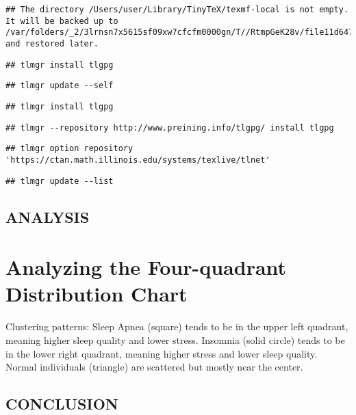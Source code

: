 \documentclass[
]{article}
\begin{document}
\begin{verbatim}
## The directory /Users/user/Library/TinyTeX/texmf-local is not empty. It will be backed up to /var/folders/_2/3lrnsn7x5615sf09xw7cfcfm0000gn/T//RtmpGeK28v/file11d647e927820 and restored later.
\end{verbatim}

\begin{verbatim}
## tlmgr install tlgpg
\end{verbatim}

\begin{verbatim}
## tlmgr update --self
\end{verbatim}

\begin{verbatim}
## tlmgr install tlgpg
\end{verbatim}

\begin{verbatim}
## tlmgr --repository http://www.preining.info/tlgpg/ install tlgpg
\end{verbatim}

\begin{verbatim}
## tlmgr option repository 'https://ctan.math.illinois.edu/systems/texlive/tlnet'
\end{verbatim}

\begin{verbatim}
## tlmgr update --list
\end{verbatim}

\subsection{ANALYSIS}\label{analysis}

\section{Analyzing the Four-quadrant Distribution
Chart}\label{analyzing-the-four-quadrant-distribution-chart}

Clustering patterns: Sleep Apnea (square) tends to be in the upper left
quadrant, meaning higher sleep quality and lower stress. Insomnia (solid
circle) tends to be in the lower right quadrant, meaning higher stress
and lower sleep quality. Normal individuals (triangle) are scattered but
mostly near the center.

\subsection{CONCLUSION}\label{conclusion}
\end{document}
